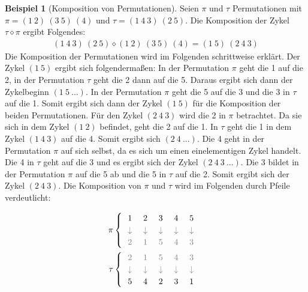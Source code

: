 \documentclass[12pt,a4paper, usenames, dvipsnames]{article}
\theoremstyle{mystyle}
\theoremstyle{definition}
\newtheorem{bsp}{Beispiel}[definition]
\begin{document}
\begin{bsp}[Komposition von Permutationen]
Seien $\pi$ und $\tau$ Permutationen mit $\pi = (1 \ 2) \ (3 \ 5) \ (4)$ und $\tau = (1 \ 4\ 3) \ (2 \ 5)$. Die Komposition der Zykel $\tau \diamond \pi$ ergibt Folgendes:
\begin{align*}
(1 \ 4\ 3) \ (2 \ 5) \diamond  (1 \ 2) \ (3 \ 5) \ (4) = (1 \ 5) \ (2 \ 4 \ 3)
\end{align*}
Die Komposition der Permutationen wird im Folgenden schrittweise erklärt.
Der Zykel $(1 \ 5)$ ergibt sich folgendermaßen: In der Permutation $\pi$ geht die 1 auf die 2, in der Permutation $\tau$ geht die 2 dann auf die 5. Daraus ergibt sich dann der Zykelbeginn $(1 \ 5 \ ...)$. In der Permutation $\pi$ geht die 5 auf die 3 und die 3 in $\tau$ auf die 1. Somit ergibt sich dann der Zykel $(1 \ 5)$ für die Komposition der beiden Permutationen. 
Für den Zykel $(2 \ 4 \ 3)$ wird die 2 in $\pi$ betrachtet. Da sie sich in dem Zykel $(1 \ 2)$ befindet, geht die 2 auf die 1. In $\tau$ geht die 1 in dem Zykel $(1 \ 4 \ 3)$ auf die 4. Somit ergibt sich $(2 \ 4 \ ...)$. Die 4 geht in der Permutation $\pi$ auf sich selbst, da es sich um einen einelementigen Zykel handelt. Die 4 in $\tau$ geht auf die 3 und es ergibt sich der Zykel $(2 \ 4 \ 3 \ ...)$. Die 3 bildet in der Permutation $\pi$ auf die 5 ab und die 5 in $\tau$ auf die 2. Somit ergibt sich der Zykel $(2 \ 4 \ 3)$.
Die Komposition von $\pi$ und $\tau$ wird im Folgenden durch Pfeile verdeutlicht:

\begin{align*}
\pi \begin{cases}
\ \  1 \ \ \ \  2 \ \ \ \  3 \ \ \ \  4 \ \ \ \  5 \\
\ \  \textcolor{gray}{\downarrow \ \ \ \ \downarrow \ \ \ \  \downarrow \ \ \ \ \downarrow \ \ \ \  \downarrow} \\
\ \  \textcolor{gray}{2 \ \ \ \  1 \ \ \ \  5 \ \ \ \  4 \ \ \ \  3}
\end{cases}
\\
\tau \begin{cases}
\ \  \textcolor{gray}{ 2 \ \ \ \  1 \ \ \ \  5 \ \ \ \  4 \ \ \ \  3} \\
\ \ \textcolor{gray}{\downarrow \ \ \ \ \downarrow \ \ \ \  \downarrow \ \ \ \ \downarrow \ \ \ \  \downarrow} \\
\ \ 5 \ \ \ \  4 \ \ \ \  2 \ \ \ \  3 \ \ \ \  1
\end{cases}
\end{align*}
 
\end{bsp}
%
%
%
%
%
%
%
%
%
%
%
%
%
\end{document}
